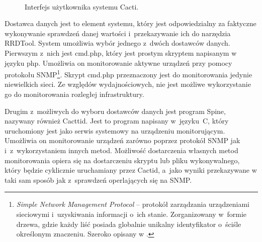 \begin{figure}[h]
\label{fig:CactiInterface}
\caption{Interfejs użytkownika systemu Cacti.}
\begin{center}
\\[0.1cm]
\end{center}
\end{figure}


Dostawca danych jest to element systemu, który jest odpowiedzialny za
faktyczne wykonywanie sprawdzeń danej wartości i~przekazywanie ich do
narzędzia RRDTool. System umożliwia wybór jednego z~dwóch dostawców
danych. Pierwszym z~nich jest cmd.php, który jest prostym skryptem
napisanym w języku php. Umożliwia on monitorowanie aktywne urządzeń
przy pomocy protokołu SNMP\footnote{ {\em Simple Network Management
    Protocol} -- protokół zarządzania urządzeniami sieciowymi
  i~uzyskiwania informacji o~ich stanie. Zorganizowany w~formie
  drzewa, gdzie każdy liść posiada globalnie unikalny identyfikator
  o~ściśle określonym znaczeniu. Szeroko opisany w \cite{www:SNMP}.}. Skrypt
cmd.php przeznaczony jest do monitorowania jedynie niewielkich
sieci. Ze względów wydajnościowych, nie jest możliwe wykorzystanie go
do monitorowania rozległej infrastruktury.

Drugim z~możliwych do wyboru dostawców danych jest program Spine,
nazywany również Cacttid. Jest to program napisany w~języku~C, który
uruchomiony jest jako serwis systemowy na urządzeniu
monitorującym. Umożliwia on monitorowanie urządzeń zarówno poprzez
protokół SNMP jak i~z~wykorzystaniem innych metod. Możliwość
dostarczenia własnych metod monitorowania opiera się na dostarczeniu
skryptu lub pliku wykonywalnego, który będzie cyklicznie uruchamiany
przez Cactid, a~jako wyniki przekazywane w taki sam sposób jak
z~sprawdzeń operlających się na SNMP.

